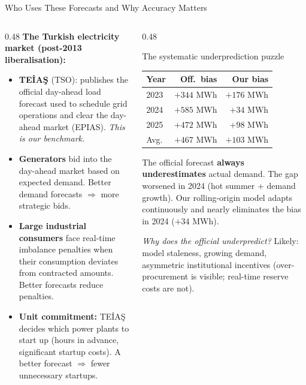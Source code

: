\documentclass[10pt,aspectratio=169]{beamer}
\begin{document}
\begin{frame}{Who Uses These Forecasts and Why Accuracy Matters}

  \begin{columns}
  \begin{column}{0.48\textwidth}
    \textbf{The Turkish electricity market (post-2013 liberalisation):}
    \vspace{0.3em}
    \begin{itemize}
      \item \textbf{TEİAŞ} (TSO): publishes the official day-ahead
        load forecast used to schedule grid operations and clear
        the day-ahead market (EPIAS). \emph{This is our benchmark.}
      \item \textbf{Generators} bid into the day-ahead market based
        on expected demand. Better demand forecasts $\Rightarrow$
        more strategic bids.
      \item \textbf{Large industrial consumers} face real-time
        imbalance penalties when their consumption deviates from
        contracted amounts. Better forecasts reduce penalties.
      \item \textbf{Unit commitment:} TEİAŞ decides which power plants
        to start up (hours in advance, significant startup costs).
        A better forecast $\Rightarrow$ fewer unnecessary startups.
    \end{itemize}
  \end{column}
  \begin{column}{0.48\textwidth}
    \begin{block}{The systematic underprediction puzzle}
      \centering
      \vspace{0.3em}
      \small
      \begin{tabular}{lrr}
        \toprule
        Year & Off.\ bias & Our bias \\
        \midrule
        2023 & $+344$ MWh & $+176$ MWh \\
        2024 & $+585$ MWh & $+34$ MWh  \\
        2025 & $+472$ MWh & $+98$ MWh  \\
        \midrule
        Avg. & $+467$ MWh & $+103$ MWh \\
        \bottomrule
      \end{tabular}
      \vspace{0.3em}
    \end{block}
    The official forecast \textbf{always underestimates} actual demand.
    The gap worsened in 2024 (hot summer + demand growth).
    Our rolling-origin model adapts continuously and nearly eliminates
    the bias in 2024 ($+34$ MWh).

    \vspace{0.3em}
    \textit{Why does the official underpredict?}
    Likely: model staleness, growing demand, asymmetric institutional
    incentives (over-procurement is visible; real-time reserve costs are not).
  \end{column}
  \end{columns}
\end{frame}
\end{document}
